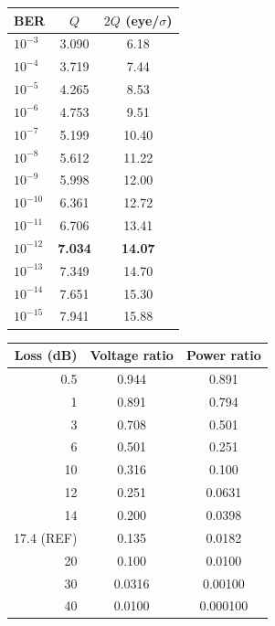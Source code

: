 \begin{table}[htbp]
\centering
\begin{minipage}[t]{0.46\linewidth}\centering
{}
\label{tab:app-q}
\small
\begin{tabular}{@{}lcc@{}}
\toprule
BER & $Q$ & $2Q$ (eye/$\sigma$)\\
\midrule
$10^{-3}$ & 3.090 & 6.18\\
$10^{-4}$ & 3.719 & 7.44\\
$10^{-5}$ & 4.265 & 8.53\\
$10^{-6}$ & 4.753 & 9.51\\
$10^{-7}$ & 5.199 & 10.40\\
$10^{-8}$ & 5.612 & 11.22\\
$10^{-9}$ & 5.998 & 12.00\\
$10^{-10}$ & 6.361 & 12.72\\
$10^{-11}$ & 6.706 & 13.41\\
\rowcolor{gtint}$10^{-12}$ & \textbf{7.034} & \textbf{14.07}\\
$10^{-13}$ & 7.349 & 14.70\\
$10^{-14}$ & 7.651 & 15.30\\
$10^{-15}$ & 7.941 & 15.88\\
\bottomrule
\end{tabular}
\end{minipage}\hfill
\begin{minipage}[t]{0.5\linewidth}\centering
{}
\label{tab:app-db}
\small
\begin{tabular}{@{}rcc@{}}
\toprule
Loss (dB) & Voltage ratio & Power ratio\\
\midrule
0.5 & 0.944 & 0.891\\
1 & 0.891 & 0.794\\
3 & 0.708 & 0.501\\
6 & 0.501 & 0.251\\
10 & 0.316 & 0.100\\
12 & 0.251 & 0.0631\\
14 & 0.200 & 0.0398\\
\rowcolor{gtint}17.4 (REF) & 0.135 & 0.0182\\
20 & 0.100 & 0.0100\\
30 & 0.0316 & 0.00100\\
40 & 0.0100 & 0.000100\\
\bottomrule
\end{tabular}
\end{minipage}
\end{table}

